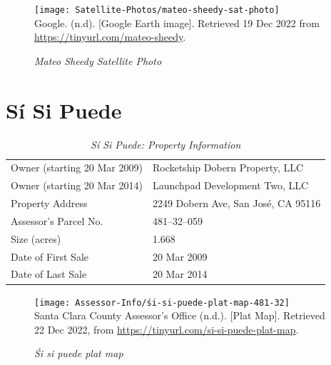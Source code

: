 \begin{figure}[hbt]
  \caption[Mateo Sheedy Satellite Photo]{\textit{Mateo Sheedy Satellite Photo}}\label{fig:mateo-sheedy-sat-photo}
  \texttt{[image: Satellite-Photos/mateo-sheedy-sat-photo]}\\ %
  \footnotesize{Google. (n.d). [Google Earth image]. Retrieved 19 Dec 2022 from \url{https://tinyurl.com/mateo-sheedy}.}
\end{figure}


\clearpage
\section{Sí Si Puede}\label{sec:sí-si-puede-info}
\begin{table}[htb]
  \SingleSpacing%
  \caption[Sí Si Puede: Property Information]{\textit{Sí Si Puede: Property Information}}\label{tab:sí-si-puede-prop-info}
  \begin{tabular}{ll}
    \toprule
    Owner (starting 20 Mar 2009) & Rocketship Dobern Property, LLC \\
    Owner (starting 20 Mar 2014) & Launchpad Development Two, LLC \\
    Property Address      & 2249 Dobern Ave, San José, CA 95116 \\
    Assessor's Parcel No. &  481–32–059 \\
    Size (acres)          &  1.668\\
    Date of First Sale    &  20 Mar 2009 \\
    Date of Last Sale     &  20 Mar 2014 \\
    \bottomrule
  \end{tabular}
\end{table}

\begin{figure}[hbt]
  \centering
  \caption[śi si puede plat map]{\textit{Śi si puede plat map}}\label{fig:śi-si-puede-plat-map}
  \noindent\texttt{[image: Assessor-Info/śi-si-puede-plat-map-481-32]}\\ %
  \footnotesize{Santa Clara County Assessor's Office (n.d.). [Plat Map]. Retrieved 22 Dec 2022, from \url{https://tinyurl.com/si-si-puede-plat-map}}.
\end{figure}

